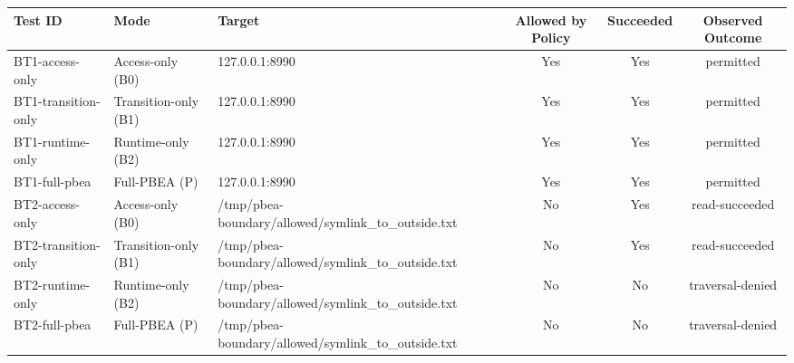 \begin{tabular}{lllccc}
\toprule
Test ID & Mode & Target & Allowed by Policy & Succeeded & Observed Outcome \\
\midrule
BT1-access-only & Access-only (B0) & 127.0.0.1:8990 & Yes & Yes & permitted \\
BT1-transition-only & Transition-only (B1) & 127.0.0.1:8990 & Yes & Yes & permitted \\
BT1-runtime-only & Runtime-only (B2) & 127.0.0.1:8990 & Yes & Yes & permitted \\
BT1-full-pbea & Full-PBEA (P) & 127.0.0.1:8990 & Yes & Yes & permitted \\
BT2-access-only & Access-only (B0) & /tmp/pbea-boundary/allowed/symlink_to_outside.txt & No & Yes & read-succeeded \\
BT2-transition-only & Transition-only (B1) & /tmp/pbea-boundary/allowed/symlink_to_outside.txt & No & Yes & read-succeeded \\
BT2-runtime-only & Runtime-only (B2) & /tmp/pbea-boundary/allowed/symlink_to_outside.txt & No & No & traversal-denied \\
BT2-full-pbea & Full-PBEA (P) & /tmp/pbea-boundary/allowed/symlink_to_outside.txt & No & No & traversal-denied \\
\bottomrule
\end{tabular}
